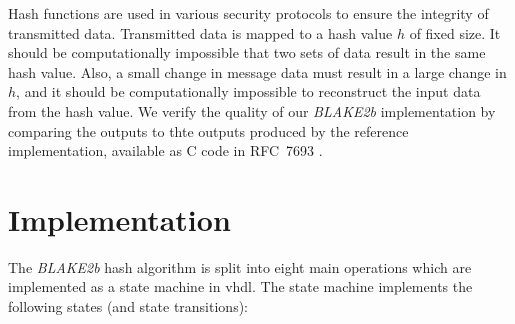 \documentclass[%
	a4paper,
]
{article}
\begin{document}
Hash functions are used in various security protocols to ensure the integrity
of transmitted data. Transmitted data is mapped to a hash value $h$ of fixed
size. It should be computationally impossible that two sets of data
result in the same hash value. Also, a small change in message data must
result in a large change in $h$, and it should be computationally impossible to
reconstruct the input data from the hash value.
%
We verify the quality of our \emph{BLAKE2b} implementation by comparing the
outputs to thte outputs produced by the reference implementation,
available as C code in RFC~7693 \autocite[16-26]{rfc7693}.
%
%
\section{Implementation}
\label{sec:implementation}

The \emph{BLAKE2b} hash algorithm is split into eight main operations which
are implemented as a state machine in \gls{vhdl}. The state machine implements
the following states (and state transitions):
\end{document}
